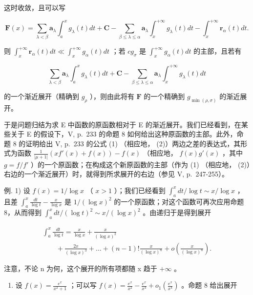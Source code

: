 这时收敛，且可以写

\[
\mathbf {F} (x) = \sum_ {\lambda <   \beta} \mathbf {a} _ {\lambda} \int_ {a} ^ {x} g _ {\lambda} (t) d t + \mathbf {C} - \sum_ {\beta \leqslant \lambda \leqslant \alpha} \mathbf {a} _ {\lambda} \int_ {x} ^ {+ \infty} g _ {\lambda} (t) d t - \int_ {x} ^ {+ \infty} \mathbf {r} _ {\alpha} (t) d t.
\]

则 \(\int_{x}^{+\infty}\mathbf{r}_{\alpha}(t)dt\ll \int_{x}^{+\infty}g_{\alpha}(t)dt\) ；若 \(cg_{\sigma}\) 是 \(\int_{x}^{+\infty}g_{\alpha}(t)dt\) 的主部，且若有

\[
\sum_ {\lambda <   \beta} \mathbf {a} _ {\lambda} \int_ {a} ^ {x} g _ {\lambda} (t) d t + \mathbf {C} - \sum_ {\beta \leqslant \lambda \leqslant \alpha} \mathbf {a} _ {\lambda} \int_ {x} ^ {+ \infty} g _ {\lambda} (t) d t
\]

的一个渐近展开（精确到 \(g_{\rho}\) ），则由此将有 \(\mathbf{F}\) 的一个精确到 \(g_{\min(\rho, \sigma)}\) 的渐近展开。

于是问题归结为求 E 中函数的原函数相对于 E 的渐近展开。我们已经看到，在某些关于 E 的假设下，V, p.~233 的命题 8 如何给出这种原函数的主部。此外，命题 8 的证明给出 V, p.~233 的公式 (1) （相应地， (2)）两边之差的表达式，其形式为函数 \(\frac{1}{|\mu+1|}\left(xf'(x)+f(x)\right)-f(x)\) （相应地， \(f(x)g'(x)\) ，其中 \(g=f/f'\) ）的一个原函数；在构成这个新原函数的主部（作为 (1) （相应地， (2)）右边的一个渐近展开）时，就得到所求展开的右边（参见 V, p.~247-255）。

例. 1) 设 \(f(x) = 1 / \log x\) （ \(x > 1\) ）；我们已经看到 \(\int_{a}^{x} dt / \log t \sim x / \log x\) ，且差 \(\int_{a}^{x} \frac{dt}{\log t} - \frac{x}{\log x}\) 是 \(1 / (\log x)^2\) 的一个原函数；对这个函数可再次应用命题 8，从而得到 \(\int_{a}^{x} dt / (\log t)^2 \sim x / (\log x)^2\) 。由递归于是得到展开

\[
\begin{array}{l} \int_ {a} ^ {x} \frac {d t}{\log t} = \frac {x}{\log x} + \frac {x}{(\log x) ^ {2}} \\ \qquad + \frac {2 x}{(\log x) ^ {3}} + \dots + (n - 1)! \frac {x}{(\log x) ^ {n}} + o \left(\frac {x}{(\log x) ^ {n}}\right). \end{array}
\]

注意，不论 n 为何，这个展开的所有项都随 x 趋于 \(+\infty\) 。

\begin{enumerate}
\def\labelenumi{\arabic{enumi})}
\setcounter{enumi}{1}
\tightlist
\item
  设 \(f(x) = \frac{e^x}{x^2 + 1}\) ；可以写 \(f(x) = \frac{e^x}{x^2} - \frac{e^x}{x^4} + o_1\left(\frac{e^x}{x^4}\right)\) 。命题 8 给出展开
\end{enumerate}

